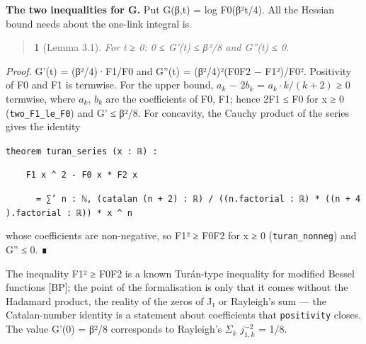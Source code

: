 \documentclass[11pt,a4paper]{article}
\theoremstyle{named}
\newtheorem*{namedthm}{}
\begin{document}
\textbf{The two inequalities for G.} Put G(β,t) = log F0(β²t/4). All the Hessian bound needs about the one-link integral is

\begin{quote}
\begin{namedthm}[Lemma 3.1]
For t ≥ 0: 0 ≤ G'(t) ≤ β²/8 and G''(t) ≤ 0.
\end{namedthm}
\end{quote}
\textit{Proof.} G'(t) = (β²/4)·F1/F0 and G''(t) = (β²/4)²(F0F2 − F1²)/F0². Positivity of F0 and F1 is termwise. For the upper bound, $a_k$ − $2b_k$ = $a_k·k/(k+2)$ ≥ 0 termwise, where $a_k$, $b_k$ are the coefficients of F0, F1; hence 2F1 ≤ F0 for x ≥ 0 (\texttt{two\_\allowbreak{}F1\_\allowbreak{}le\_\allowbreak{}F0}) and G' ≤ β²/8. For concavity, the Cauchy product of the series gives the identity

\begin{leancode}
\item \texttt{theorem\ \allowbreak{}turan\_\allowbreak{}series\ \allowbreak{}(x\ \allowbreak{}:\ \allowbreak{}ℝ)\ \allowbreak{}:}
\item \texttt{\ \allowbreak{}\ \allowbreak{}\ \allowbreak{}\ \allowbreak{}F1\ \allowbreak{}x\ \allowbreak{}\textasciicircum{}\ \allowbreak{}2\ \allowbreak{}-\ \allowbreak{}F0\ \allowbreak{}x\ \allowbreak{}*\ \allowbreak{}F2\ \allowbreak{}x}
\item \texttt{\ \allowbreak{}\ \allowbreak{}\ \allowbreak{}\ \allowbreak{}\ \allowbreak{}\ \allowbreak{}=\ \allowbreak{}∑'\ \allowbreak{}n\ \allowbreak{}:\ \allowbreak{}ℕ,\ \allowbreak{}(catalan\ \allowbreak{}(n\ \allowbreak{}+\ \allowbreak{}2)\ \allowbreak{}:\ \allowbreak{}ℝ)\ \allowbreak{}/\ \allowbreak{}((n.\allowbreak{}factorial\ \allowbreak{}:\ \allowbreak{}ℝ)\ \allowbreak{}*\ \allowbreak{}((n\ \allowbreak{}+\ \allowbreak{}4).\allowbreak{}factorial\ \allowbreak{}:\ \allowbreak{}ℝ))\ \allowbreak{}*\ \allowbreak{}x\ \allowbreak{}\textasciicircum{}\ \allowbreak{}n}
\end{leancode}
whose coefficients are non-negative, so F1² ≥ F0F2 for x ≥ 0 (\texttt{turan\_\allowbreak{}nonneg}) and G'' ≤ 0. ∎

The inequality F1² ≥ F0F2 is a known Turán-type inequality for modified Bessel functions [BP]; the point of the formalisation is only that it comes without the Hadamard product, the reality of the zeros of J₁ or Rayleigh's sum — the Catalan-number identity is a statement about coefficients that \texttt{positivity} closes. The value G'(0) = β²/8 corresponds to Rayleigh's $Σ_k$ $j_{1,k}^{−2}$ = 1/8.
\end{document}
